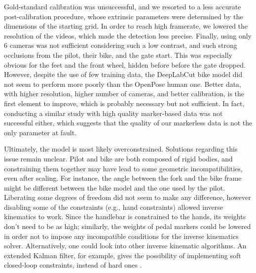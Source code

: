 Gold-standard calibration was unsuccessful, and we resorted to a less accurate post-calibration procedure, whose extrinsic parameters were determined by the dimensions of the starting grid. In order to reach high framerate, we lowered the resolution of the videos, which made the detection less precise. Finally, using only 6 cameras was not sufficient considering such a low contrast, and such strong occlusions from the pilot, their bike, and the gate start. This was especially obvious for the feet and the front wheel, hidden before before the gate dropped. However, despite the use of few training data, the DeepLabCut bike model did not seem to perform more poorly than the OpenPose human one. Better data, with higher resolution, higher number of cameras, and better calibration, is the first element to improve, which is probably necessary but not sufficient. In fact, conducting a similar study with high quality marker-based data was not successful either, which suggests that the quality of our markerless data is not the only parameter at fault. 

Ultimately, the model is most likely overconstrained. Solutions regarding this issue remain unclear. Pilot and bike are both composed of rigid bodies, and constraining them together may have lead to some geometric incompatibilities, even after scaling. For instance, the angle between the fork and the bike frame might be different between the bike model and the one used by the pilot. Liberating some degrees of freedom did not seem to make any difference, however disabling some of the constraints (e.g., hand constraints) allowed inverse kinematics to work. Since the handlebar is constrained to the hands, its weights don't need to be as high; similarly, the weights of pedal markers could be lowered in order not to impose any incompatible conditions for the inverse kinematics solver. Alternatively, one could look into other inverse kinematic algorithms. An extended Kalman filter, for example, gives the possibility of implementing soft closed-loop constraints, instead of hard ones \cite{Fohanno2014}.


